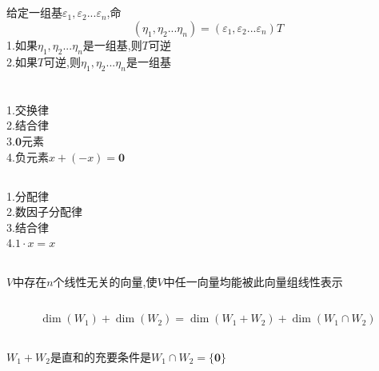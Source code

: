 \documentclass[11pt, a4paper, UTF8]{ctexart}
\begin{document}
\subsection{}
给定一组基$\varepsilon_1,\varepsilon_2...\varepsilon_n$,命
\[(\eta_1,\eta_2...\eta_n)=(\varepsilon_1,\varepsilon_2...\varepsilon_n)T\]
1.如果$\eta_1,\eta_2...\eta_n$是一组基,则$T$可逆\\
2.如果$T$可逆,则$\eta_1,\eta_2...\eta_n$是一组基
\section{}
\subsection{}
1.交换律\\
2.结合律\\
3.$\bm0$元素\\
4.负元素$x+(-x)=\bm0$\\
\subsection{}
1.分配律\\
2.数因子分配律\\
3.结合律\\
4.$1\cdot x=x$\\
\subsection{}
$V$中存在$n$个线性无关的向量,使$V$中任一向量均能被此向量组线性表示
\subsection{}
\[\dim(W_1)+\dim(W_2)=\dim(W_1+W_2)+\dim(W_1\cap W_2)\]
\subsection{}
$W_1+W_2$是直和的充要条件是$W_1\cap W_2=\{\bm0\}$\\
\end{document}
